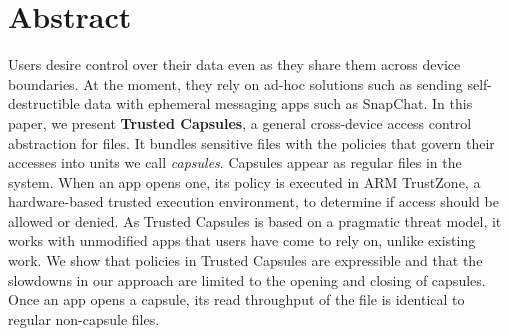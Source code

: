 
\chapter{Abstract}

Users desire control over their data even as they share them across device
  boundaries. At the moment, they rely on ad-hoc solutions such as sending
  self-destructible data with ephemeral messaging apps such as SnapChat. In this
  paper, we present \textbf{Trusted Capsules}, a general cross-device access
  control abstraction for files. It bundles sensitive files with the policies
  that govern their accesses into units we call {\em capsules}. Capsules appear
  as regular files in the system. When an app opens one, its policy is executed
  in ARM TrustZone, a hardware-based trusted execution environment, to determine
  if access should be allowed or denied. As Trusted Capsules is based on a
  pragmatic threat model, it works with unmodified apps that users have come to
  rely on, unlike existing work. We show that policies in Trusted Capsules are
  expressible and that the slowdowns in our approach are limited to the opening
  and closing of capsules. Once an app opens a capsule, its read throughput of
  the file is identical to regular non-capsule files.


